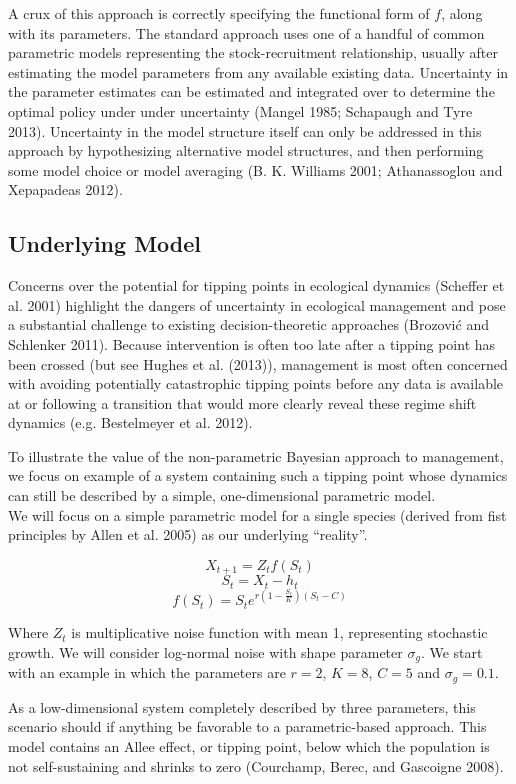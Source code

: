 \documentclass[author-year, review]{elsarticle} %
\begin{document}
A crux of this approach is correctly specifying the functional form of
$f$, along with its parameters. The standard approach uses one of a
handful of common parametric models representing the stock-recruitment
relationship, usually after estimating the model parameters from any
available existing data. Uncertainty in the parameter estimates can be
estimated and integrated over to determine the optimal policy under
under uncertainty (Mangel 1985; Schapaugh and Tyre 2013). Uncertainty in
the model structure itself can only be addressed in this approach by
hypothesizing alternative model structures, and then performing some
model choice or model averaging (B. K. Williams 2001; Athanassoglou and
Xepapadeas 2012).

\subsection{Underlying Model}

Concerns over the potential for tipping points in ecological dynamics
(Scheffer et al. 2001) highlight the dangers of uncertainty in
ecological management and pose a substantial challenge to existing
decision-theoretic approaches (Brozović and Schlenker 2011). Because
intervention is often too late after a tipping point has been crossed
(but see Hughes et al. (2013)), management is most often concerned with
avoiding potentially catastrophic tipping points before any data is
available at or following a transition that would more clearly reveal
these regime shift dynamics (e.g. Bestelmeyer et al. 2012).

To illustrate the value of the non-parametric Bayesian approach to
management, we focus on example of a system containing such a tipping
point whose dynamics can still be described by a simple, one-dimensional
parametric model.\\We will focus on a simple parametric model for a
single species (derived from fist principles by Allen et al. 2005) as
our underlying ``reality''.

\[X_{t+1} = Z_t f(S_t)  \] \[S_t = X_t - h_t \]
\[f(S_t) = S_t e^{r \left(1 - \frac{S_t}{K}\right)\left(S_t - C\right)} \]

Where $Z_t$ is multiplicative noise function with mean 1, representing
stochastic growth. We will consider log-normal noise with shape
parameter $\sigma_g$. We start with an example in which the parameters
are $r =2$, $K=8$, $C=5$ and $\sigma_g = 0.1$.

As a low-dimensional system completely described by three parameters,
this scenario should if anything be favorable to a parametric-based
approach. This model contains an Allee effect, or tipping point, below
which the population is not self-sustaining and shrinks to zero
(Courchamp, Berec, and Gascoigne 2008).
\end{document}
